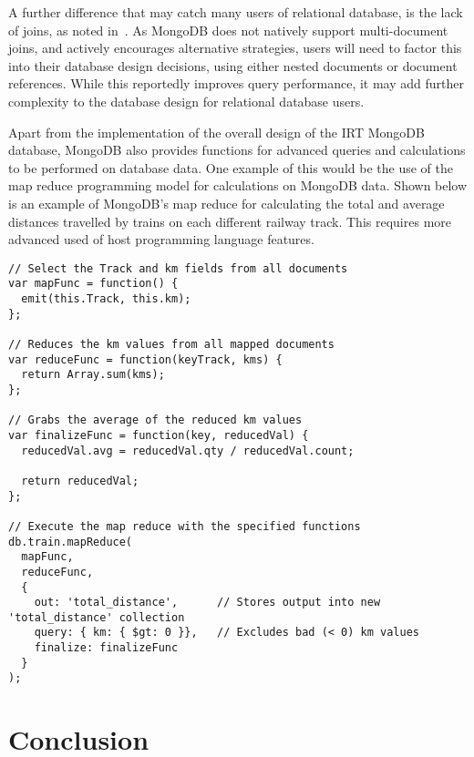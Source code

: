 \documentclass[a4paper,11pt]{article}
\begin{document}
A further difference that may catch many users of relational database, is the lack of joins, as noted in~.
As MongoDB does not natively support multi-document joins, and actively encourages alternative strategies, users will
need to factor this into their database design decisions, using either nested documents or document references. While this
reportedly improves query performance, it may add further complexity to the database design for relational database
users.

Apart from the implementation of the overall design of the IRT MongoDB database, MongoDB also provides functions for
advanced queries and calculations to be performed on database data. One example of this would be the use of the map
reduce programming model for calculations on MongoDB data. Shown below is an example of MongoDB's map reduce for
calculating the total and average distances travelled by trains on each different railway track. This requires more
advanced used of host programming language features.

\begin{lstlisting}[caption=A basic map reduce implementation to get total and average distance travelled by trains on each track.]
// Select the Track and km fields from all documents
var mapFunc = function() {
  emit(this.Track, this.km);
};

// Reduces the km values from all mapped documents
var reduceFunc = function(keyTrack, kms) {
  return Array.sum(kms);
};

// Grabs the average of the reduced km values
var finalizeFunc = function(key, reducedVal) {
  reducedVal.avg = reducedVal.qty / reducedVal.count;

  return reducedVal;
};

// Execute the map reduce with the specified functions
db.train.mapReduce(
  mapFunc,
  reduceFunc,
  {
    out: 'total_distance',      // Stores output into new 'total_distance' collection
    query: { km: { $gt: 0 }},   // Excludes bad (< 0) km values
    finalize: finalizeFunc
  }
);
\end{lstlisting}



\newpage

\section{Conclusion} %
\label{sec:conclusion}
\end{document}

